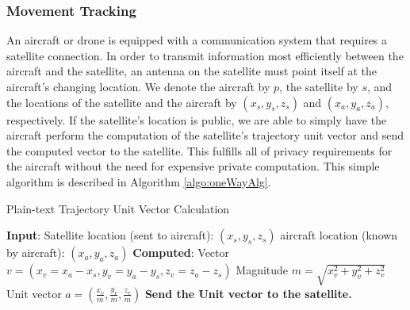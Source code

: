 \documentclass[9pt,sigconf,screen]{acmart}
\begin{document}
\subsubsection{Movement Tracking}
An aircraft or drone is equipped with a communication system that requires a satellite connection. In order to transmit information most efficiently between the aircraft and the satellite, an antenna on the satellite must point itself at the aircraft's changing location. We denote the aircraft by $p$, the satellite by $s$, and the locations of the satellite and the aircraft by $(x_s, y_s, z_s)$  and $(x_a, y_a, z_a)$, respectively. If the satellite's location is public,  we are able to simply have the aircraft perform the computation of the satellite's trajectory unit vector and send the computed vector to the satellite. This fulfills all of privacy requirements for the aircraft without the need for expensive private computation. This simple algorithm is described in Algorithm \ref{algo:oneWayAlg}.







\begin{algorithm}
\caption{Plain-text Trajectory Unit Vector Calculation}
\label{algo:oneWayAlg}

\begin{algorithmic}
\STATE \textbf{Input}:
\STATE Satellite location (sent to aircraft): $(x_s, y_s, z_s)$
\STATE aircraft location (known by aircraft): $(x_a, y_a, z_a)$
\STATE \textbf{Computed}:
\STATE Vector $v = (x_v=x_a - x_s, y_v=y_a - y_s, z_v=z_a - z_s)$
\STATE Magnitude $m = \sqrt{x_v^2 + y_v^2 + z_v^2}$
\STATE Unit vector $a = \left(\frac{x_v}{m}, \frac{y_v}{m}, \frac{z_v}{m}\right)$
\STATE \textbf{Send the Unit vector to the satellite.}
\end{algorithmic}
\end{algorithm}
\end{document}
